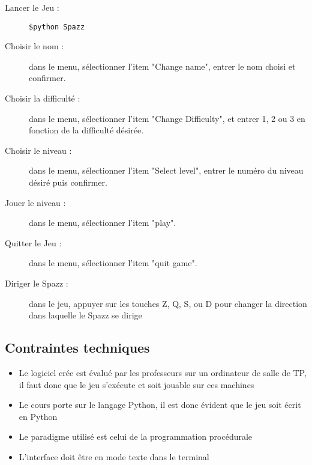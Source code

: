 \documentclass[a4paper,11pt]{scrartcl}
\begin{document}
\begin{description}
    \item [Lancer le Jeu : ] \texttt{\$python Spazz}
	\item [Choisir le nom : ] dans le menu, sélectionner l'item "Change name", entrer le nom choisi et confirmer.
    \item [Choisir la difficulté : ] dans le menu, sélectionner l'item "Change Difficulty", et entrer 1, 2 ou 3 en fonction de la difficulté désirée.
    \item [Choisir le niveau : ] dans le menu, sélectionner l'item "Select level", entrer le numéro du niveau désiré puis confirmer.
    \item [Jouer le niveau : ] dans le menu, sélectionner l'item "play".
    \item [Quitter le Jeu : ] dans le menu, sélectionner l'item "quit game".
    \item [Diriger le Spazz : ] dans le jeu, appuyer sur les touches Z, Q, S, ou D pour changer la direction dans laquelle le Spazz se dirige
\end{description}

\subsection{Contraintes techniques}

\begin{itemize}[label = $\bullet$]
	\item Le logiciel crée est évalué par les professeurs sur un ordinateur de salle de TP, il faut donc que le jeu s’exécute et soit jouable sur ces machines
	\item Le cours porte sur le langage Python, il est donc évident que le jeu soit écrit en Python
	\item Le paradigme utilisé est celui de la programmation procédurale
	\item L'interface doit être en mode texte dans le terminal
\end{itemize}
\end{document}
